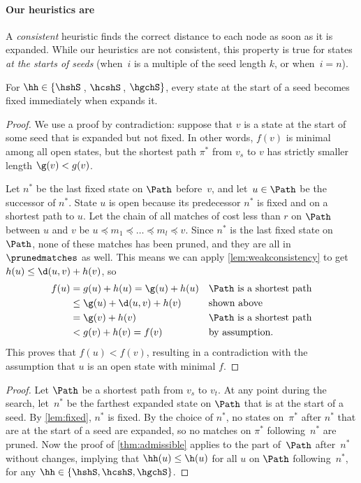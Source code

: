 \paragraph{Our heuristics are \wa}\label{sec:weak-admissible-h}

A \emph{consistent} heuristic finds the correct distance to each node as soon
as it is expanded. While our heuristics are not consistent, this property is
true for states \emph{at the starts of seeds} (when~$i$ is a multiple of the
seed length $k$, or when~$i=n$).

\begin{lem}\label{lem:fixed}%
  For $\hh \in \{\hshS$\,, $\hcshS$\,, $\hgchS\}$, every state at the start of a
  seed becomes fixed immediately when \A expands it.
\end{lem}
\begin{proof}
  We use a proof by contradiction: suppose that $v$ is a state at the start of some
  seed that is expanded but not fixed. In other words, $f(v)$ is minimal among
  all open states, but the shortest path $\pi^*$ from $v_s$ to $v$ has strictly
  smaller length ${\g(v) < g(v)}$.

  Let $n^*$ be the last fixed state on $\Path$ before~$v$, and let~$u \in \Path$
  be the successor of $n^*$. State $u$ is open because its predecessor $n^*$ is
  fixed and on a shortest path to $u$. Let the chain of all matches of cost less
  than $r$ on $\Path$ between $u$ and $v$ be ${u\preceq m_1 \preceq \dots
  \preceq m_l \preceq v}$. Since $n^*$ is the last fixed state on $\Path$, none
  of these matches has been pruned, and they are all in $\prunedmatches$ as
  well. This means we can apply \cref{lem:weakconsistency} to get $h(u) \leq
  \d(u, v) + h(v)$, so
  \begin{align*}
    f(u) &= g(u)+h(u)
         = \g(u)+h(u) && \text{$\Path$ is a shortest path} \\
         &\leq \g(u)+\d(u,v)+h(v) && \text{shown above} \\
         &= \g(v) + h(v) &&\text{$\Path$ is a shortest path} \\
         &< g(v)+h(v) = f(v) && \text{by assumption.}
  \end{align*}
  This proves that $f(u) < f(v)$, resulting in a
  contradiction with the assumption that $u$ is an open state with minimal $f$.
\end{proof}

\thmpartialadmissibleh*
\begin{proof}
  Let $\Path$ be a shortest path from $v_s$ to $v_t$. At any point during the \A
  search, let~$n^*$ be the farthest expanded state on $\Path$ that is at the
  start of a seed. By \cref{lem:fixed}, $n^*$ is fixed. By the choice of $n^*$,
  no states on~$\pi^*$ after $n^*$ that are at the start of a seed are expanded,
  so no matches on $\pi^*$ following~$n^*$ are pruned. Now the proof
  of \cref{thm:admissible} applies to the part of~$\Path$ after~$n^*$ without
  changes, implying that $\hh(u) \leq \h(u)$ for all $u$ on $\Path$
  following~$n^*$, for any ${\hh \in \{\hshS, \hcshS, \hgchS\}}$.
\end{proof}
